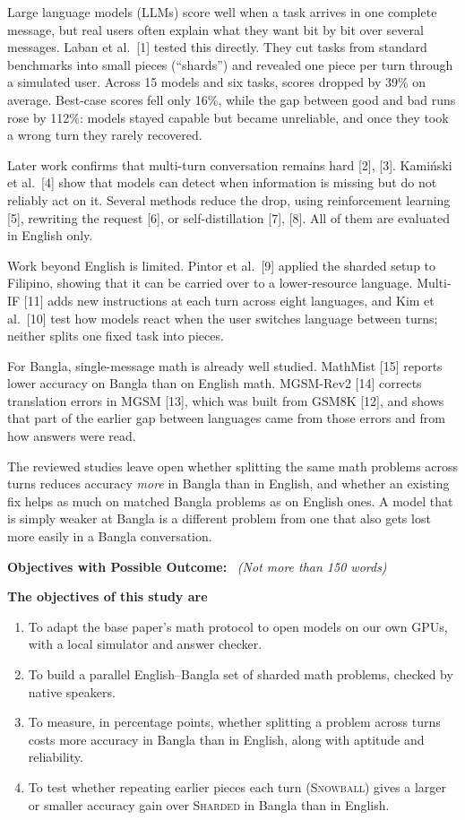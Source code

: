 \documentclass[11pt,a4paper]{article}
\newcommand{\formitem}[3]{%
  \par\vspace{4pt}\noindent\makebox[1.6em][l]{\textbf{#1.}}\textbf{#2}%
  \if\relax\detokenize{#3}\relax\else\ \textit{(#3)}\fi\par}
\begin{document}
Large language models (LLMs) score well when a task arrives in one complete message, but real users often explain what they want bit by bit over several messages. Laban et al.\ [1] tested this directly. They cut tasks from standard benchmarks into small pieces (``shards'') and revealed one piece per turn through a simulated user. Across 15 models and six tasks, scores dropped by 39\% on average. Best-case scores fell only 16\%, while the gap between good and bad runs rose by 112\%: models stayed capable but became unreliable, and once they took a wrong turn they rarely recovered.

Later work confirms that multi-turn conversation remains hard [2], [3]. Kami\'nski et al.\ [4] show that models can detect when information is missing but do not reliably act on it. Several methods reduce the drop, using reinforcement learning [5], rewriting the request [6], or self-distillation [7], [8]. All of them are evaluated in English only.

Work beyond English is limited. Pintor et al.\ [9] applied the sharded setup to Filipino, showing that it can be carried over to a lower-resource language. Multi-IF [11] adds new instructions at each turn across eight languages, and Kim et al.\ [10] test how models react when the user switches language between turns; neither splits one fixed task into pieces.

For Bangla, single-message math is already well studied. MathMist [15] reports lower accuracy on Bangla than on English math. MGSM-Rev2 [14] corrects translation errors in MGSM [13], which was built from GSM8K [12], and shows that part of the earlier gap between languages came from those errors and from how answers were read.

The reviewed studies leave open whether splitting the same math problems across turns reduces accuracy \emph{more} in Bangla than in English, and whether an existing fix helps as much on matched Bangla problems as on English ones. A model that is simply weaker at Bangla is a different problem from one that also gets lost more easily in a Bangla conversation.

\formitem{9}{Objectives with Possible Outcome:}{Not more than 150 words}

\textbf{The objectives of this study are}
\begin{enumerate}[leftmargin=2em,itemsep=1pt,topsep=2pt]
\item To adapt the base paper's math protocol to open models on our own GPUs, with a local simulator and answer checker.
\item To build a parallel English--Bangla set of sharded math problems, checked by native speakers.
\item To measure, in percentage points, whether splitting a problem across turns costs more accuracy in Bangla than in English, along with aptitude and reliability.
\item To test whether repeating earlier pieces each turn (\textsc{Snowball}) gives a larger or smaller accuracy gain over \textsc{Sharded} in Bangla than in English.
\end{enumerate}
\end{document}
